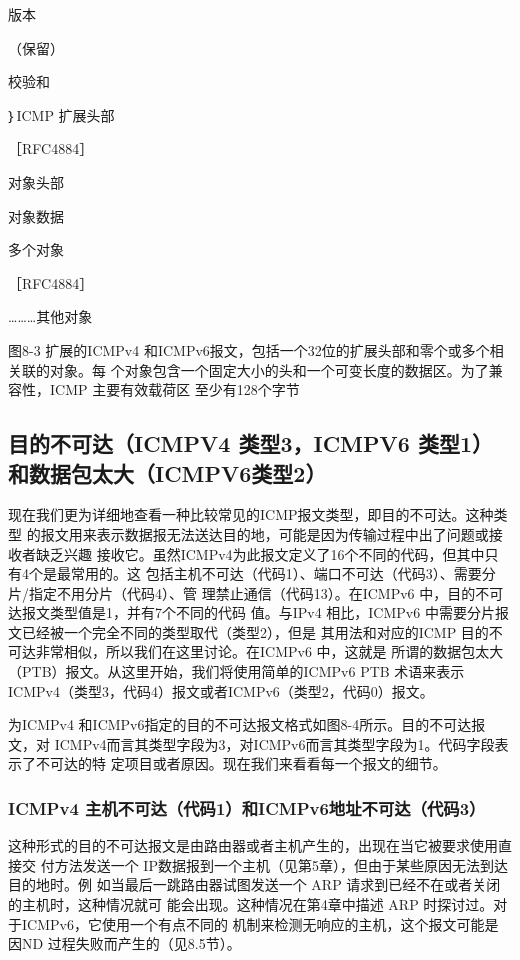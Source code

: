 版本

（保留）

校验和

｝ICMP 扩展头部

［RFC4884］

对象头部

对象数据

多个对象

［RFC4884］

………其他对象

图8-3 扩展的ICMPv4 和ICMPv6报文，包括一个32位的扩展头部和零个或多个相关联的对象。每
个对象包含一个固定大小的头和一个可变长度的数据区。为了兼容性，ICMP 主要有效载荷区
至少有128个字节

\subsection{目的不可达（ICMPV4 类型3，ICMPV6 类型1）和数据包太大（ICMPV6类型2）}

现在我们更为详细地查看一种比较常见的ICMP报文类型，即目的不可达。这种类型
的报文用来表示数据报无法送达目的地，可能是因为传输过程中出了问题或接收者缺乏兴趣
接收它。虽然ICMPv4为此报文定义了16个不同的代码，但其中只有4个是最常用的。这
包括主机不可达（代码1）、端口不可达（代码3）、需要分片/指定不用分片（代码4）、管
理禁止通信（代码13）。在ICMPv6 中，目的不可达报文类型值是1，并有7个不同的代码
值。与IPv4 相比，ICMPv6 中需要分片报文已经被一个完全不同的类型取代（类型2），但是
其用法和对应的ICMP 目的不可达非常相似，所以我们在这里讨论。在ICMPv6 中，这就是
所谓的数据包太大（PTB）报文。从这里开始，我们将使用简单的ICMPv6 PTB 术语来表示
ICMPv4（类型3，代码4）报文或者ICMPv6（类型2，代码0）报文。

为ICMPv4 和ICMPv6指定的目的不可达报文格式如图8-4所示。目的不可达报文，对
ICMPv4而言其类型字段为3，对ICMPv6而言其类型字段为1。代码字段表示了不可达的特
定项目或者原因。现在我们来看看每一个报文的细节。

\subsubsection{ICMPv4 主机不可达（代码1）和ICMPv6地址不可达（代码3）}
这种形式的目的不可达报文是由路由器或者主机产生的，出现在当它被要求使用直接交
付方法发送一个 IP数据报到一个主机（见第5章），但由于某些原因无法到达目的地时。例
如当最后一跳路由器试图发送一个 ARP 请求到已经不在或者关闭的主机时，这种情况就可
能会出现。这种情况在第4章中描述 ARP 时探讨过。对于ICMPv6，它使用一个有点不同的
机制来检测无响应的主机，这个报文可能是因ND 过程失败而产生的（见8.5节）。


